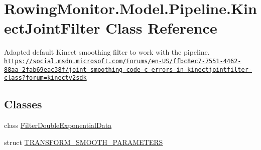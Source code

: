 \hypertarget{class_rowing_monitor_1_1_model_1_1_pipeline_1_1_kinect_joint_filter}{}\section{Rowing\+Monitor.\+Model.\+Pipeline.\+Kinect\+Joint\+Filter Class Reference}
\label{class_rowing_monitor_1_1_model_1_1_pipeline_1_1_kinect_joint_filter}


Adapted default Kinect smoothing filter to work with the pipeline. \href{https://social.msdn.microsoft.com/Forums/en-US/ffbc8ec7-7551-4462-88aa-2fab69eac38f/joint-smoothing-code-c-errors-in-kinectjointfilter-class?forum=kinectv2sdk}{\tt https\+://social.\+msdn.\+microsoft.\+com/\+Forums/en-\/\+U\+S/ffbc8ec7-\/7551-\/4462-\/88aa-\/2fab69eac38f/joint-\/smoothing-\/code-\/c-\/errors-\/in-\/kinectjointfilter-\/class?forum=kinectv2sdk}  


\subsection*{Classes}
\begin{DoxyCompactItemize}
\item 
class \hyperlink{class_rowing_monitor_1_1_model_1_1_pipeline_1_1_kinect_joint_filter_1_1_filter_double_exponential_data}{Filter\+Double\+Exponential\+Data}
\item 
struct \hyperlink{struct_rowing_monitor_1_1_model_1_1_pipeline_1_1_kinect_joint_filter_1_1_t_r_a_n_s_f_o_r_m___s_m_o_o_t_h___p_a_r_a_m_e_t_e_r_s}{T\+R\+A\+N\+S\+F\+O\+R\+M\+\_\+\+S\+M\+O\+O\+T\+H\+\_\+\+P\+A\+R\+A\+M\+E\+T\+E\+RS}
\end{DoxyCompactItemize}
